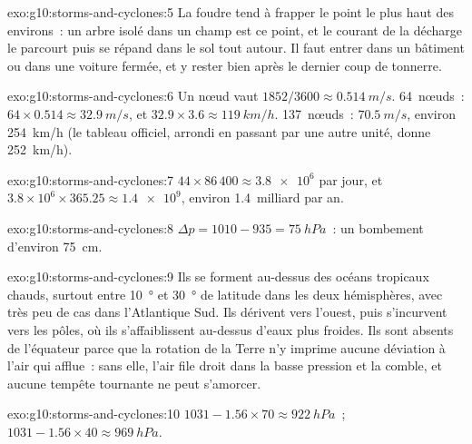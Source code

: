 \begin{solution}{exo:g10:storms-and-cyclones:5}
La foudre tend à frapper le point le plus haut des environs~: un arbre isolé
dans un champ est ce point, et le courant de la décharge le parcourt puis se
répand dans le sol tout autour. Il faut entrer dans un bâtiment ou dans une
voiture fermée, et y rester bien après le dernier coup de tonnerre.
\end{solution}

\begin{solution}{exo:g10:storms-and-cyclones:6}
Un nœud vaut $1852/3600 \approx \qty{0.514}{m/s}$. \num{64}~nœuds~: $64 \times
0.514 \approx \qty{32.9}{m/s}$, et $32.9 \times 3.6 \approx
\qty{119}{km/h}$. \num{137}~nœuds~: $\qty{70.5}{m/s}$, environ
\qty{254}{km/h} (le tableau officiel, arrondi en passant par une autre
unité, donne \qty{252}{km/h}).
\end{solution}

\begin{solution}{exo:g10:storms-and-cyclones:7}
$44 \times 86\,400 \approx \num{3.8e6}$  par jour, et $3.8\times10^6
\times 365.25 \approx \num{1.4e9}$, environ 1.4~milliard par an.
\end{solution}

\begin{solution}{exo:g10:storms-and-cyclones:8}
$\Delta p = 1010 - 935 = \qty{75}{hPa}$~: un bombement d'environ \qty{75}{cm}.
\end{solution}

\begin{solution}{exo:g10:storms-and-cyclones:9}
Ils se forment au-dessus des océans tropicaux chauds, surtout entre
\qty{10}{\degree} et \qty{30}{\degree} de latitude dans les deux hémisphères,
avec très peu de cas dans l'Atlantique Sud. Ils dérivent vers l'ouest, puis
s'incurvent vers les pôles, où ils s'affaiblissent au-dessus d'eaux plus
froides. Ils sont absents de l'équateur parce que la rotation de la Terre
n'y imprime aucune déviation à l'air qui afflue~: sans elle, l'air file
droit dans la basse pression et la comble, et aucune tempête tournante ne
peut s'amorcer.
\end{solution}

\begin{solution}{exo:g10:storms-and-cyclones:10}
$1031 - 1.56 \times 70 \approx \qty{922}{hPa}$~; $1031 - 1.56 \times 40
\approx \qty{969}{hPa}$.
\end{solution}

